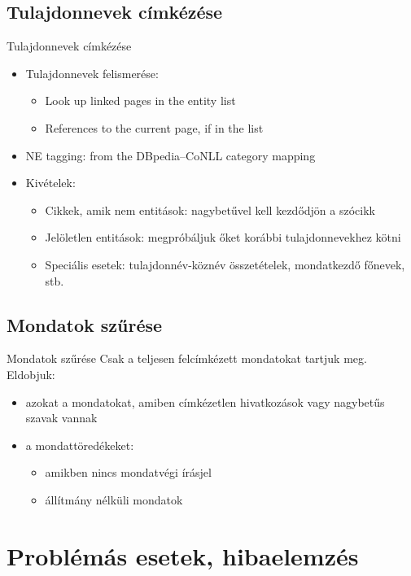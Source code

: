 \documentclass[utf8x,t]{beamer}
\newcommand{\vitem}{\item \vspace{4pt}}
\begin{document}
\subsection{Tulajdonnevek címkézése}
\begin{frame}{Tulajdonnevek címkézése}
  \bigskip
  \begin{itemize}
  \vitem Tulajdonnevek felismerése:
    \begin{itemize}
    \vitem Look up linked pages in the entity list
    \vitem References to the current page, if in the list
    \end{itemize}
  \vitem NE tagging: from the DBpedia--CoNLL category mapping
  \vitem Kivételek:
    \begin{itemize}
    \vitem Cikkek, amik nem entitások: nagybetűvel kell kezdődjön a szócikk
    \vitem Jelöletlen entitások: megpróbáljuk őket korábbi tulajdonnevekhez kötni
    \vitem Speciális esetek: tulajdonnév-köznév összetételek, mondatkezdő főnevek, stb.
    \end{itemize}
  \end{itemize}
\end{frame}

\subsection{Mondatok szűrése}
\begin{frame}{Mondatok szűrése}
  \bigskip
  Csak a teljesen felcímkézett mondatokat tartjuk meg. Eldobjuk:
  \smallskip
  \begin{itemize}
  \vitem azokat a mondatokat, amiben címkézetlen hivatkozások vagy nagybetűs szavak vannak
  \vitem a mondattöredékeket:
    \begin{itemize}
    \vitem amikben nincs mondatvégi írásjel
    \vitem állítmány nélküli mondatok %
    \end{itemize}
  \end{itemize}
\end{frame}

\section{Problémás esetek, hibaelemzés}

\end{document}
